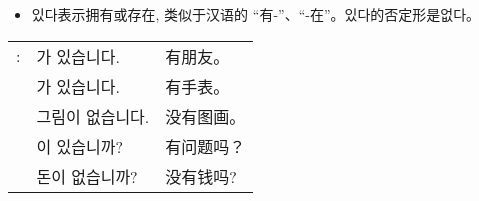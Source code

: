 \begin{grammar}
    \begin{grammarsect}[\kr 있다]
        \begin{itemize}
            \item {\kr 있다}表示拥有或存在, 类似于汉语的 “有-”、“-在”。{\kr 있다}的否定形是{\kr 없다}。
        \end{itemize}
        \begin{tabular}{lll}
            \kr \ruby{例}{예}: &\kr \ruby{親舊}{친구}가 있습니다. &有朋友。\\
            &\kr \ruby{時計}{시계}가 있습니다. &有手表。\\
            &\kr 그림이 없습니다. &没有图画。\\
            &\kr \ruby{質問}{질문}이 있습니까? &有问题吗？\\
            &\kr 돈이 없습니까? &没有钱吗?
        \end{tabular}\\
    \end{grammarsect}
\end{grammar}
